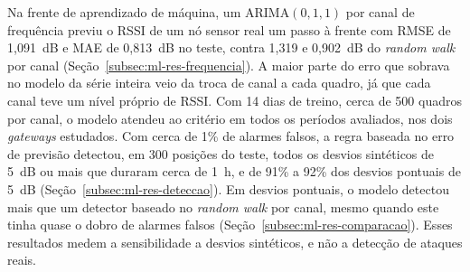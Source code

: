 Na frente de aprendizado de máquina, um ARIMA$(0,1,1)$ por canal de frequência
previu o RSSI de um nó sensor real um passo à frente com RMSE de 1,091~dB e MAE
de 0,813~dB no teste, contra 1,319 e 0,902~dB do \textit{random walk} por canal
(Seção~\ref{subsec:ml-res-frequencia}). A maior parte do erro que sobrava no
modelo da série inteira veio da troca de canal a cada quadro, já que cada canal
teve um nível próprio de RSSI. Com 14 dias de treino, cerca de 500 quadros por
canal, o modelo atendeu ao critério em todos os períodos avaliados, nos dois
\textit{gateways} estudados. Com cerca de 1\% de alarmes falsos, a regra baseada
no erro de previsão detectou, em 300 posições do teste, todos os desvios
sintéticos de 5~dB ou mais que duraram cerca de 1~h, e de 91\% a 92\% dos
desvios pontuais de 5~dB (Seção~\ref{subsec:ml-res-deteccao}). Em desvios
pontuais, o modelo detectou mais que um detector baseado no \textit{random walk}
por canal, mesmo quando este tinha quase o dobro de alarmes falsos
(Seção~\ref{subsec:ml-res-comparacao}). Esses resultados medem a sensibilidade
a desvios sintéticos, e não a detecção de ataques reais.
